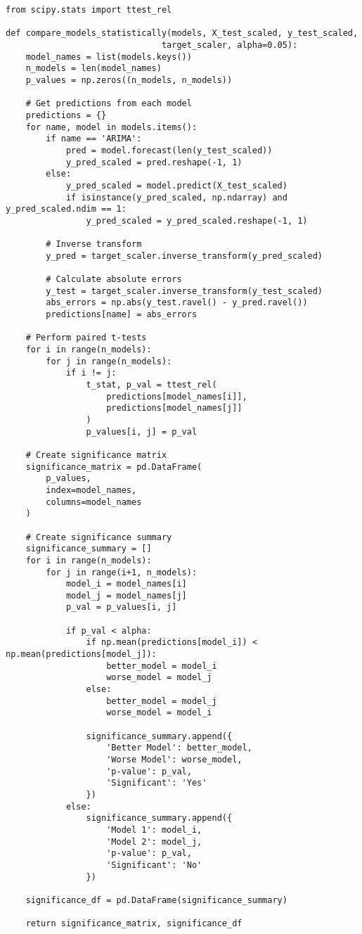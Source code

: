 \documentclass[12pt]{article}
\begin{document}
\begin{verbatim}
from scipy.stats import ttest_rel

def compare_models_statistically(models, X_test_scaled, y_test_scaled, 
                               target_scaler, alpha=0.05):
    model_names = list(models.keys())
    n_models = len(model_names)
    p_values = np.zeros((n_models, n_models))
    
    # Get predictions from each model
    predictions = {}
    for name, model in models.items():
        if name == 'ARIMA':
            pred = model.forecast(len(y_test_scaled))
            y_pred_scaled = pred.reshape(-1, 1)
        else:
            y_pred_scaled = model.predict(X_test_scaled)
            if isinstance(y_pred_scaled, np.ndarray) and y_pred_scaled.ndim == 1:
                y_pred_scaled = y_pred_scaled.reshape(-1, 1)
        
        # Inverse transform
        y_pred = target_scaler.inverse_transform(y_pred_scaled)
        
        # Calculate absolute errors
        y_test = target_scaler.inverse_transform(y_test_scaled)
        abs_errors = np.abs(y_test.ravel() - y_pred.ravel())
        predictions[name] = abs_errors
    
    # Perform paired t-tests
    for i in range(n_models):
        for j in range(n_models):
            if i != j:
                t_stat, p_val = ttest_rel(
                    predictions[model_names[i]],
                    predictions[model_names[j]]
                )
                p_values[i, j] = p_val
    
    # Create significance matrix
    significance_matrix = pd.DataFrame(
        p_values,
        index=model_names,
        columns=model_names
    )
    
    # Create significance summary
    significance_summary = []
    for i in range(n_models):
        for j in range(i+1, n_models):
            model_i = model_names[i]
            model_j = model_names[j]
            p_val = p_values[i, j]
            
            if p_val < alpha:
                if np.mean(predictions[model_i]) < np.mean(predictions[model_j]):
                    better_model = model_i
                    worse_model = model_j
                else:
                    better_model = model_j
                    worse_model = model_i
                
                significance_summary.append({
                    'Better Model': better_model,
                    'Worse Model': worse_model,
                    'p-value': p_val,
                    'Significant': 'Yes'
                })
            else:
                significance_summary.append({
                    'Model 1': model_i,
                    'Model 2': model_j,
                    'p-value': p_val,
                    'Significant': 'No'
                })
    
    significance_df = pd.DataFrame(significance_summary)
    
    return significance_matrix, significance_df
\end{verbatim}
\end{document}
